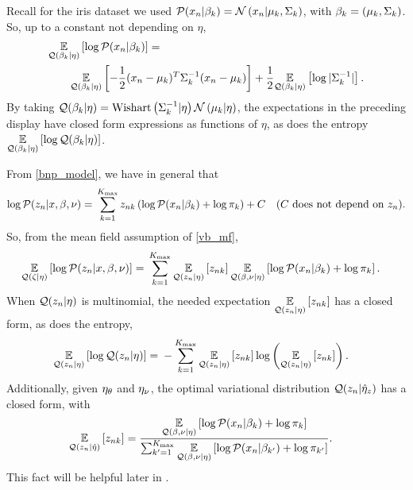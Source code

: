 \begin{ex}
%
Recall for the iris dataset we used $\mathcal{P}(x_n \vert \beta_k) = \mathcal{N}\left(x_n \vert
\mu_k, \Sigma_k\right)$, with $\beta_k = (\mu_k, \Sigma_k)$.  So,
up to a constant not depending on $\eta$,
%
\begin{align*}
%
\MoveEqLeft
\expect{\q(\beta_\k \vert \eta)}{\logp(\x_\n \vert \beta_\k)} =\\
&
\expect{\q(\beta_\k \vert \eta)}{
-\frac{1}{2}(\x_n - \mu_k)^T \Sigma_\k^{-1} (\x_n - \mu_k)}
+\frac{1}{2} \expect{\q(\beta_\k \vert \eta)}{\log |\Sigma_\k^{-1}|}.
%
\end{align*}
%
By taking $\mathcal{Q}(\beta_k \vert \eta) = \mathrm{Wishart}\left(\Sigma_k^{-1} \vert \eta\right)
\mathcal{N}\left(\mu_k \vert \eta\right)$, the expectations in the preceding display have closed
form expressions as functions of $\eta$, as does the entropy
$\underset{\mathcal{Q}(\beta_k \vert \eta)}{\mathbb{E}}\left[\log \mathcal{Q}(\beta_k \vert \eta)\right]$.
%
\end{ex}




\begin{ex}
%
From \eqref{bnp_model}, we have in general that
%
\begin{align*}
%
\logp(\z_n \vert \x, \beta, \nu) ={}&
\sum_{k=1}^{\kmax}
    \z_{\n\k} \left(
        \logp(\x_n \vert \beta_\k) + \log \pi_\k
    \right) + \const & \constdesc{\z_\n}.
%
\end{align*}
%
So, from the mean field assumption of \eqref{vb_mf},
%
\begin{align*}
%
\expect{\q(\zeta \vert \eta)}{\logp(\z_n \vert \x, \beta, \nu)} ={}&
\sum_{k=1}^{\kmax}
    \expect{\q(\z_\n \vert \eta)}{\z_{\n\k}}
    \expect{\q(\beta, \nu \vert \eta)}
           {\logp(\x_n \vert \beta_\k) + \log \pi_\k}.
%
\end{align*}
%
When $\mathcal{Q}(z_n \vert \eta)$ is multinomial, the needed expectation
$\underset{\mathcal{Q}(z_n \vert \eta)}{\mathbb{E}}\left[z_{nk}\right]$ has a closed form, as does the
entropy,
%
\begin{align*}
%
\expect{\q(\z_\n \vert \eta)}{\log \q(\z_\n \vert \eta)} ={}&
    - \sum_{\k=1}^{\kmax}
        \expect{\q(\z_\n \vert \eta)}{\z_{\n\k}}
        \log \left( \expect{\q(\z_\n \vert \eta)}{\z_{\n\k}} \right).
%
\end{align*}
%
Additionally, given $\eta_{\theta}$ and $\eta_{\nu}$, the optimal
variational distribution $\mathcal{Q}(z_n \vert \hat\eta_{z})$ has a closed form, with
%
\begin{align*}
%
\expect{\q(\z_\n \vert \etaopt)}{\z_{\n\k}} ={}&
\frac{
    \expect{\q(\beta, \nu \vert \eta)}
           {\logp(\x_n \vert \beta_\k) + \log \pi_\k}
}{
    \sum_{\k'=1}^{\kmax}
    \expect{\q(\beta, \nu \vert \eta)}
           {\logp(\x_n \vert \beta_{\k'}) + \log \pi_{\k'}}
}.
%
\end{align*}
%
This fact will be helpful later in .
%
\end{ex}

